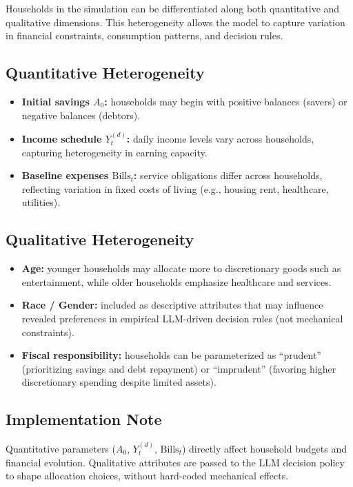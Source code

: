 \documentclass[12pt]{article}
\begin{document}
Households in the simulation can be differentiated along both quantitative and qualitative dimensions.  
This heterogeneity allows the model to capture variation in financial constraints, consumption patterns, and decision rules.  

\subsection*{Quantitative Heterogeneity}
\begin{itemize}
    \item \textbf{Initial savings $A_0$:} households may begin with positive balances (savers) or negative balances (debtors).
    \item \textbf{Income schedule $Y_t^{(d)}$:} daily  income levels vary across households, capturing heterogeneity in earning capacity.
    \item \textbf{Baseline expenses $\mathrm{Bills}_t$:} service obligations differ across households, reflecting variation in fixed costs of living (e.g., housing rent, healthcare, utilities).
\end{itemize}

\subsection*{Qualitative Heterogeneity}
\begin{itemize}
    \item \textbf{Age:} younger households may allocate more to discretionary goods such as entertainment, while older households emphasize healthcare and services.
    \item \textbf{Race / Gender:} included as descriptive attributes that may influence revealed preferences in empirical LLM-driven decision rules (not mechanical constraints).
    \item \textbf{Fiscal responsibility:} households can be parameterized as ``prudent'' (prioritizing savings and debt repayment) or ``imprudent'' (favoring higher discretionary spending despite limited assets).
\end{itemize}

\subsection*{Implementation Note}
Quantitative parameters ($A_0$, $Y_t^{(d)}$, $\mathrm{Bills}_t$) directly affect household budgets and financial evolution.  
Qualitative attributes are passed to the LLM decision policy to shape allocation choices, without hard-coded mechanical effects.
\end{document}
